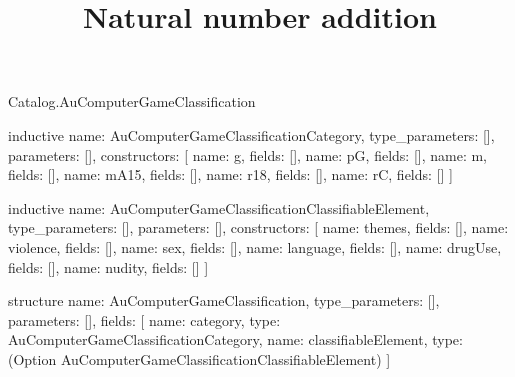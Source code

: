 \begin{lexlean}{Catalog.AuComputerGameClassification}
\title{Natural number addition}
\begin{semanticmodule}
inductive{
  name: AuComputerGameClassificationCategory,
  type_parameters: [],
  parameters: [],
  constructors: [
    {name: g, fields: []},
    {name: pG, fields: []},
    {name: m, fields: []},
    {name: mA15, fields: []},
    {name: r18, fields: []},
    {name: rC, fields: []}
  ]
}

inductive{
  name: AuComputerGameClassificationClassifiableElement,
  type_parameters: [],
  parameters: [],
  constructors: [
    {name: themes, fields: []},
    {name: violence, fields: []},
    {name: sex, fields: []},
    {name: language, fields: []},
    {name: drugUse, fields: []},
    {name: nudity, fields: []}
  ]
}

structure{
  name: AuComputerGameClassification,
  type_parameters: [],
  parameters: [],
  fields: [
    {name: category, type: AuComputerGameClassificationCategory},
    {name: classifiableElement, type: (Option AuComputerGameClassificationClassifiableElement)}
  ]
}
\end{semanticmodule}
\end{lexlean}
